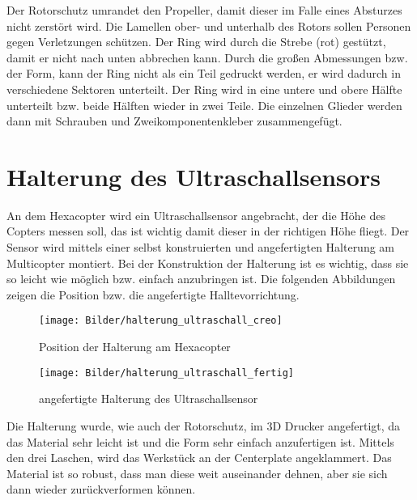 Der Rotorschutz umrandet den Propeller, damit dieser im Falle eines Absturzes nicht zerstört wird. Die Lamellen ober- und unterhalb des Rotors sollen Personen gegen Verletzungen schützen. 
Der Ring wird durch die Strebe (rot) gestützt, damit er nicht nach unten abbrechen kann. 
Durch die großen Abmessungen bzw. der Form, kann der Ring nicht als ein Teil gedruckt werden, er wird dadurch in verschiedene Sektoren unterteilt. Der Ring wird in eine untere und obere Hälfte unterteilt bzw. beide Hälften wieder in zwei Teile. Die einzelnen Glieder werden dann mit Schrauben und Zweikomponentenkleber zusammengefügt. 

\section{Halterung des Ultraschallsensors}
An dem Hexacopter wird ein Ultraschallsensor angebracht, der die Höhe des Copters messen soll, das ist wichtig damit dieser in der richtigen Höhe fliegt. Der Sensor wird mittels einer selbst konstruierten und angefertigten Halterung am Multicopter montiert.
Bei der Konstruktion der Halterung ist es wichtig, dass sie so leicht wie möglich bzw. einfach anzubringen ist. Die folgenden Abbildungen zeigen die Position bzw. die angefertigte Halltevorrichtung.

\begin{figure}[htb]
\begin{centering}
\texttt{[image: Bilder/halterung\_ultraschall\_creo]}
\par\end{centering}
\caption{Position der Halterung am Hexacopter}
\label{Halterung des Ultraschallsensor}
\end{figure}

\begin{figure}[htb]
\begin{centering}
\texttt{[image: Bilder/halterung\_ultraschall\_fertig]}
\par\end{centering}
\caption{angefertigte Halterung des Ultraschallsensor}
\label{Halterung des Ultraschallsensor}
\end{figure}

Die Halterung wurde, wie auch der Rotorschutz, im 3D Drucker angefertigt, da das Material sehr leicht ist und die Form sehr einfach anzufertigen ist. Mittels den drei Laschen, wird das Werkstück an der Centerplate angeklammert.
Das Material ist so robust, dass man diese weit auseinander dehnen, aber sie sich dann wieder zurückverformen können. 






